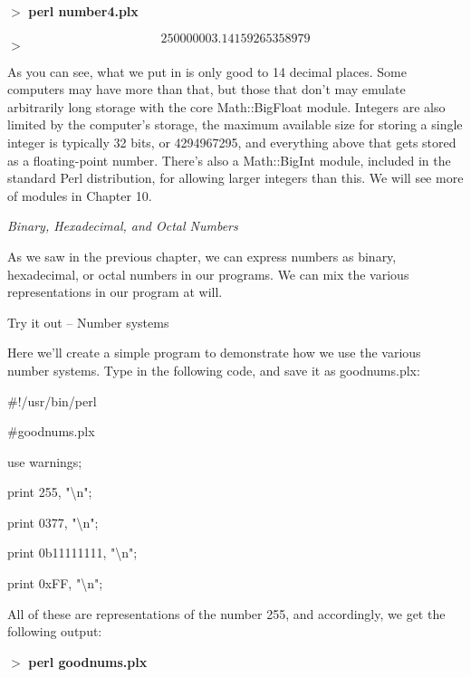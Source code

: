 \documentclass[a4paper,11pt]{book}
\begin{document}
\noindent 

\noindent $>$ \textbf{perl number4.plx}

\[25000000 3.14159265358979\] 
$>$

\noindent 

\noindent As you can see, what we put in is only good to 14 decimal places. Some computers may have more than that, but those that don't may emulate arbitrarily long storage with the core Math::BigFloat module. Integers are also limited by the computer's storage, the maximum available size for storing a single  integer is typically 32 bits, or 4294967295, and everything above that gets stored as a floating-point number. There's also a Math::BigInt module, included in the standard Perl distribution, for allowing larger integers than this. We will see more of modules in Chapter 10.

\noindent 

\noindent \textit{Binary, Hexadecimal, and Octal Numbers}

\noindent As we saw in the previous chapter, we can express numbers as binary, hexadecimal, or octal numbers in our programs. We can mix the various representations in our program at will.

\noindent 

\noindent 

\noindent Try it out -- Number systems

\noindent Here we'll create a simple program to demonstrate how we use the various number systems. Type in the following code, and save it as goodnums.plx:

\noindent 

\noindent 

\noindent \#!/usr/bin/perl

\noindent \#goodnums.plx

\noindent use warnings;

\noindent print 255, "\textbackslash n";

\noindent print 0377, "\textbackslash n";

\noindent print 0b11111111, "\textbackslash n";

\noindent print 0xFF, "\textbackslash n";

\noindent 

\noindent All of these are representations of the number 255, and accordingly, we get the following output:

\noindent 

\noindent $>$ \textbf{perl goodnums.plx}
\end{document}
